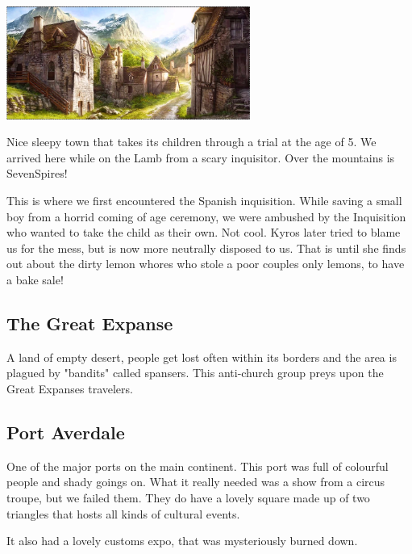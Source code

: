 \vspace{5mm}

\begin{center}
\includegraphics[width=80mm]{./content/img/largosk.png}
\begin{figure}[h]
\end{figure}
\end{center}

\noindent 

Nice sleepy town that takes its children through a trial at the age of 5. We arrived here while on the Lamb from a scary inquisitor. Over the mountains is SevenSpires!

This is where we first encountered the Spanish inquisition. While saving a small boy from a horrid coming of age ceremony, we were ambushed by the Inquisition who wanted to take the child as their own. Not cool. Kyros later tried to blame us for the mess, but is now more neutrally disposed to us. That is until she finds out about the dirty lemon whores who stole a poor couples only lemons, to have a bake sale! 

\subsection*{The Great Expanse} 

A land of empty desert, people get lost often within its borders and the area is plagued by "bandits" called spansers. This anti-church group preys upon the Great Expanses travelers. 

\smallskip

\subsection*{Port Averdale} 

One of the major ports on the main continent. This port was full of colourful people and shady goings on. What it really needed was a show from a circus troupe, but we failed them. They do have a lovely square made up of two triangles that hosts all kinds of cultural events.

It also had a lovely customs expo, that was mysteriously burned down.

